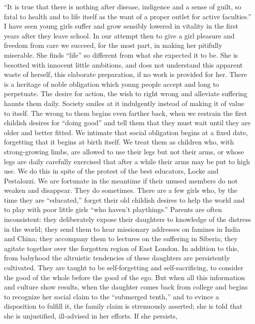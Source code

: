 ``It is true that there is nothing after disease, indigence and a
sense of guilt, so fatal to health and to life itself as the want of a
proper outlet for active faculties.'' I have seen young girls suffer
and grow sensibly lowered in vitality in the first years after they
leave school. In our attempt then to give a girl pleasure and freedom
from care we succeed, for the most part, in making her pitifully
miserable. She finds ``life'' so different from what she expected it
to be. She is besotted with innocent little ambitions, and does not
understand this apparent waste of herself, this elaborate preparation,
if no work is provided for her. There is a heritage of noble
obligation which young people accept and long to perpetuate. The
desire for action, the wish to right wrong and alleviate suffering
haunts them daily. Society smiles at it indulgently instead of making
it of value to itself. The wrong to them begins even farther back,
when we restrain the first childish desires for ``doing good'' and
tell them that they must wait until they are older and better fitted.
We intimate that social obligation begins at a fixed date, forgetting
that it begins at birth itself. We treat them as children who, with
strong-growing limbs, are allowed to use their legs  but not
their arms, or whose legs are daily carefully exercised that after a
while their arms may be put to high use. We do this in spite of the
protest of the best educators, Locke and Pestalozzi. We are fortunate
in the meantime if their unused members do not weaken and disappear.
They do sometimes. There are a few girls who, by the time they are
``educated,'' forget their old childish desires to help the world and
to play with poor little girls ``who haven't playthings.'' Parents are
often inconsistent: they deliberately expose their daughters to
knowledge of the distress in the world; they send them to hear
missionary addresses on famines in India and China; they accompany
them to lectures on the suffering in Siberia; they agitate together
over the forgotten region of East London. In addition to this, from
babyhood the altruistic tendencies of these daughters are persistently
cultivated. They are taught to be self-forgetting and
self-sacrificing, to consider the good of the whole before the good of
the ego. But when all this information and culture show results, when
the daughter comes back from college and begins to recognize her
social claim to the ``submerged tenth,'' and to evince a disposition
to fulfill it, the family claim is strenuously asserted; she is told
that she is unjustified, ill-advised in her efforts. If she persists,
